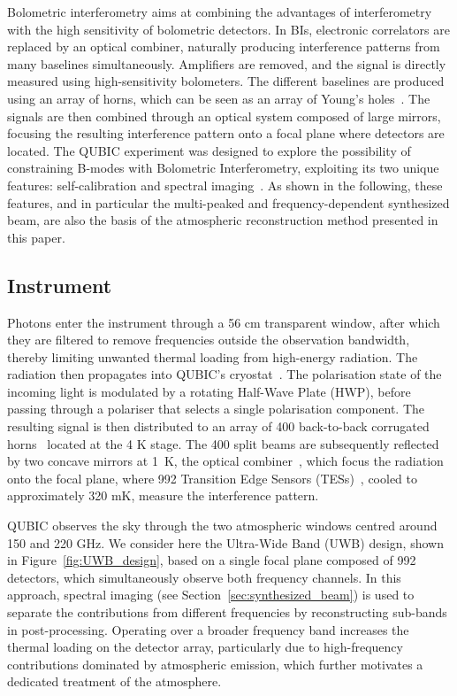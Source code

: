 \documentclass[a4paper,11pt]{article}
\begin{document}
Bolometric interferometry aims at combining the advantages of interferometry with the high sensitivity of bolometric detectors. In BIs, electronic correlators are replaced by an optical combiner, naturally producing interference patterns from many baselines simultaneously. Amplifiers are removed, and the signal is directly measured using high-sensitivity bolometers. The different baselines are produced using an array of horns, which can be seen as an array of Young's holes~\cite{young1804}. The signals are then combined through an optical system composed of large mirrors, focusing the resulting interference pattern onto a focal plane where detectors are located. The QUBIC experiment was designed to explore the possibility of constraining B-modes with Bolometric Interferometry, exploiting its two unique features: self-calibration and spectral imaging~\cite{QUBICI}. As shown in the following, these features, and in particular the multi-peaked and frequency-dependent synthesized beam, are also the basis of the atmospheric reconstruction method presented in this paper.

\subsection{Instrument}
\label{sec:instrument}

Photons enter the instrument through a 56 cm transparent window, after which they are filtered to remove frequencies outside the observation bandwidth, thereby limiting unwanted thermal loading from high-energy radiation. The radiation then propagates into QUBIC's cryostat~\cite{QUBICV}. The polarisation state of the incoming light is modulated by a rotating Half-Wave Plate (HWP), before passing through a polariser that selects a single polarisation component. The resulting signal is then distributed to an array of 400 back-to-back corrugated horns~\cite{QUBICVII} located at the 4 K stage. The 400 split beams are subsequently reflected by two concave mirrors at 1~K, the optical combiner~\cite{QUBICVIII}, which focus the radiation onto the focal plane, where 992 Transition Edge Sensors (TESs)~\cite{QUBICIV}, cooled to approximately 320 mK, measure the interference pattern.

QUBIC observes the sky through the two atmospheric windows centred around 150 and 220 GHz. We consider here the Ultra-Wide Band (UWB) design, shown in Figure~\ref{fig:UWB_design}, based on a single focal plane composed of 992 detectors, which simultaneously observe both frequency channels. In this approach, spectral imaging (see Section~\ref{sec:synthesized_beam}) is used to separate the contributions from different frequencies by reconstructing sub-bands in post-processing. Operating over a broader frequency band increases the thermal loading on the detector array, particularly due to high-frequency contributions dominated by atmospheric emission, which further motivates a dedicated treatment of the atmosphere.
\end{document}
